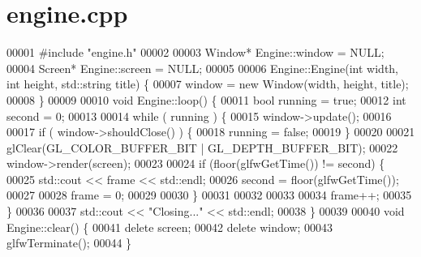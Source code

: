 \section{engine.\+cpp}
\label{engine_8cpp_source}

\begin{DoxyCode}
00001 \textcolor{preprocessor}{#include "engine.h"}
00002 
00003 Window* Engine::window = NULL;
00004 Screen* Engine::screen = NULL;
00005 
00006 Engine::Engine(\textcolor{keywordtype}{int} width, \textcolor{keywordtype}{int} height, std::string title) \{
00007     window = \textcolor{keyword}{new} Window(width, height, title);
00008 \}
00009 
00010 \textcolor{keywordtype}{void} Engine::loop() \{
00011     \textcolor{keywordtype}{bool} running = \textcolor{keyword}{true};
00012     \textcolor{keywordtype}{int} second = 0;
00013 
00014     \textcolor{keywordflow}{while} ( running ) \{
00015         window->update();
00016 
00017         \textcolor{keywordflow}{if} ( window->shouldClose() ) \{
00018             running = \textcolor{keyword}{false};
00019         \}
00020 
00021         glClear(GL\_COLOR\_BUFFER\_BIT | GL\_DEPTH\_BUFFER\_BIT);
00022         window->render(screen);
00023 
00024         \textcolor{keywordflow}{if} (floor(glfwGetTime()) != second) \{
00025             std::cout << frame << std::endl;
00026             second = floor(glfwGetTime());
00027 
00028             frame = 0;
00029             
00030         \}
00031 
00032         
00033 
00034         frame++;
00035     \}
00036 
00037     std::cout << \textcolor{stringliteral}{"Closing..."} << std::endl;
00038 \}
00039 
00040 \textcolor{keywordtype}{void} Engine::clear() \{
00041     \textcolor{keyword}{delete} screen;
00042     \textcolor{keyword}{delete} window;
00043     glfwTerminate();
00044 \}
\end{DoxyCode}

